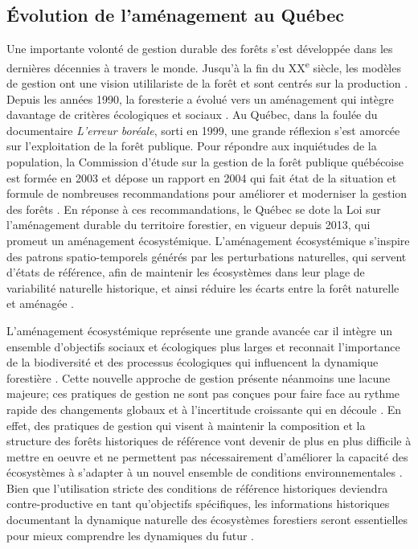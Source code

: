 \hypertarget{uxe9volution-de-lamuxe9nagement-au-quuxe9bec}{%
\subsection{Évolution de l'aménagement au
Québec}\label{uxe9volution-de-lamuxe9nagement-au-quuxe9bec}}

Une importante volonté de gestion durable des forêts s'est développée
dans les dernières décennies à travers le monde. Jusqu'à la fin du
XX\textsuperscript{e} siècle, les modèles de gestion ont une vision
utililariste de la forêt et sont centrés sur la production
\citep{kuuluvainen_natural_2012}. Depuis les années 1990, la foresterie
a évolué vers un aménagement qui intègre davantage de critères
écologiques et sociaux \citep{messier_managing_2013}. Au Québec, dans la
foulée du documentaire \emph{L'erreur boréale}, sorti en 1999, une
grande réflexion s'est amorcée sur l'exploitation de la forêt publique.
Pour répondre aux inquiétudes de la population, la Commission d'étude
sur la gestion de la forêt publique québécoise est formée en 2003 et
dépose un rapport en 2004 qui fait état de la situation et formule de
nombreuses recommandations pour améliorer et moderniser la gestion des
forêts
\citep{commission_detude_sur_la_gestion_de_la_foret_publique_quebecoise_commission_2004}.
En réponse à ces recommandations, le Québec se dote la Loi sur
l'aménagement durable du territoire forestier, en vigueur depuis 2013,
qui promeut un aménagement écosystémique. L'aménagement écosystémique
s'inspire des patrons spatio-temporels générés par les perturbations
naturelles, qui servent d'états de référence, afin de maintenir les
écosystèmes dans leur plage de variabilité naturelle historique, et
ainsi réduire les écarts entre la forêt naturelle et aménagée
\citep{vaillancourt_implementation_2009, attiwill_disturbance_1994}.

L'aménagement écosystémique représente une grande avancée car il intègre
un ensemble d'objectifs sociaux et écologiques plus larges et reconnait
l'importance de la biodiversité et des processus écologiques qui
influencent la dynamique forestière
\citep{messier_functional_2019, kuuluvainen_forest_2009}. Cette nouvelle
approche de gestion présente néanmoins une lacune majeure; ces pratiques
de gestion ne sont pas conçues pour faire face au rythme rapide des
changements globaux et à l'incertitude croissante qui en découle
\citep{messier_dealing_2016, millar_climate_2007}. En effet, des
pratiques de gestion qui visent à maintenir la composition et la
structure des forêts historiques de référence vont devenir de plus en
plus difficile à mettre en oeuvre
\citep{duveneck_measuring_2016, boulanger_climate_2019} et ne permettent
pas nécessairement d'améliorer la capacité des écosystèmes à s'adapter à
un nouvel ensemble de conditions environnementales
\citep{seastedt_management_2008}. Bien que l'utilisation stricte des
conditions de référence historiques deviendra contre-productive en tant
qu'objectifs spécifiques, les informations historiques documentant la
dynamique naturelle des écosystèmes forestiers seront essentielles pour
mieux comprendre les dynamiques du futur \citep{harris_ecological_2006}.


